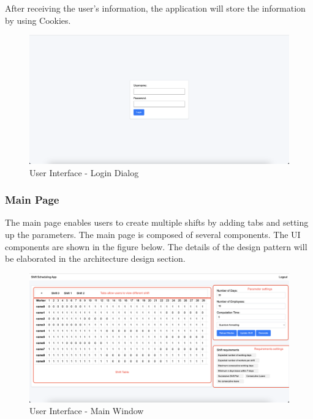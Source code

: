 \documentclass[11pt, oneside]{article}   	%
\begin{document}
After receiving the user's information, the application will store the information by using Cookies. 

\begin{figure}[h]
\centering
\includegraphics[width=\textwidth]{login_window}
\caption{User Interface - Login Dialog}
\label{uilogin}
\end{figure}

\subsubsection{Main Page}
The main page enables users to create multiple shifts by adding tabs and setting up the parameters. The main page is composed of several components. The UI components are shown in the figure below. The details of the design pattern will be elaborated in the architecture design section.
\begin{figure}[h]
\centering
\includegraphics[width=\textwidth]{main_window}
\caption{User Interface - Main Window}
\label{uimainwindow}
\end{figure}

\end{document}
